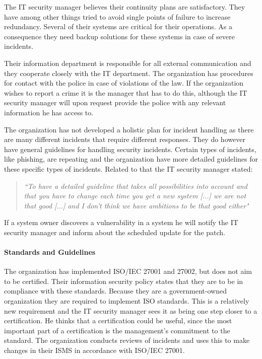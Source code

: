 The IT security manager believes their continuity plans are satisfactory. They have among other things tried to avoid single points of failure to increase redundancy. Several of their systems are critical for their operations. As a consequence they need backup solutions for these systems in case of severe incidents. 

Their information department is responsible for all external communication and they cooperate closely with the IT department. The organization has procedures for contact with the police in case of violations of the law. If the organization wishes to report a crime it is the manager that has to do this, although the IT security manager will upon request provide the police with any relevant information he has access to. 

The organization has not developed a holistic plan for incident handling as there are many different incidents that require different responses. They do however have general guidelines for handling security incidents. Certain types of incidents, like phishing, are repeating and the organization have more detailed guidelines for these specific types of incidents. Related to that the IT security manager stated:

\begin{quote}
\textit{``To have a detailed guideline that takes all possibilities into account and that you have to change each time you get a new system %
[...] we are not that good [...] and I don't think we have ambitions to be that good either"}
\end{quote}

If a system owner discovers a vulnerability in a system he will notify the IT security manager and inform about the scheduled update for the patch. 

\paragraph{Standards and Guidelines}
The organization has implemented \acs{ISO}/\acs{IEC} 27001 and 27002, but does not aim to be certified. Their information security policy states that they are to be in compliance with these standards. Because they are a government-owned organization they are required to implement \acs{ISO} standards. This is a relatively new requirement and the IT security manager sees it as being one step closer to a certification. He thinks that a certification could be useful, since the most important part of a certification is the management's commitment to the standard. The organization conducts reviews of incidents and uses this to make changes in their \ac{ISMS} in accordance with \acs{ISO}/\acs{IEC} 27001. 

